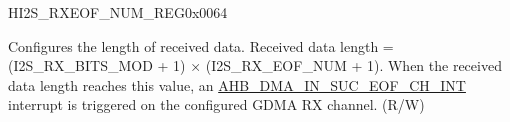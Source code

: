 \begin{register}{H}{I2S\_RXEOF\_NUM\_REG}{0x0064}\label{regdesc:I2SRXEOFNUMREG}
%
%
\regnewline%
\begin{regdesc}\begin{reglist}
\label{fielddesc:I2SRXEOFNUM}\item [I2S\_RX\_EOF\_NUM] Configures the length of received data. Received data length = (I2S\_RX\_BITS\_MOD + 1) × (I2S\_RX\_EOF\_NUM + 1). When the received data length reaches this value, an \hyperref[int:GDMAINSUCEOFINT]{AHB\_DMA\_IN\_SUC\_EOF\_CH\_INT} interrupt is triggered on the configured GDMA RX channel. (R/W)
\end{reglist}\end{regdesc}
\end{register}


